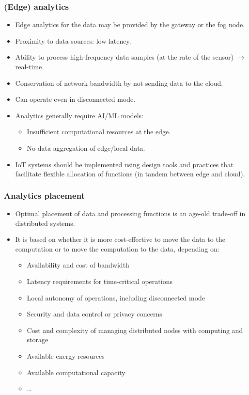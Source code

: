 \subsubsection{(Edge) analytics}
\begin{itemize}
    \item Edge analytics for the data may be provided by the gateway or the fog node.
    \item Proximity to data sources: low latency.
    \item Ability to process high-frequency data samples (at the rate of the sensor) $\rightarrow$ real-time.
    \item Conservation of network bandwidth by not sending data to the cloud.
    \item Can operate even in disconnected mode.
    \item Analytics generally require AI/ML models:
    \begin{itemize}
        \item Insufficient computational resources at the edge.
        \item No data aggregation of edge/local data.
    \end{itemize}
    \item IoT systems should be implemented using design tools and practices that facilitate flexible allocation of functions (in tandem between edge and cloud).
\end{itemize}

\subsubsection{Analytics placement}
\begin{itemize}
    \item Optimal placement of data and processing functions is an age-old trade-off in distributed systems.
    \item It is based on whether it is more cost-effective to move the data to the computation or to move the computation to the data, depending on:
    \begin{itemize}
        \item Availability and cost of bandwidth
        \item Latency requirements for time-critical operations
        \item Local autonomy of operations, including disconnected mode
        \item Security and data control or privacy concerns
        \item Cost and complexity of managing distributed nodes with computing and storage
        \item Available energy resources
        \item Available computational capacity
        \item \ldots
    \end{itemize}
\end{itemize}


